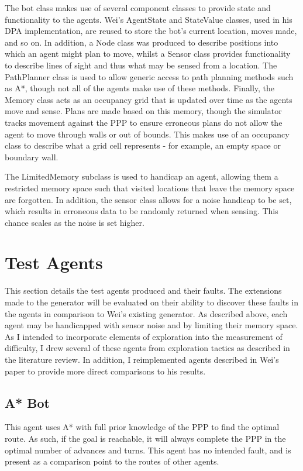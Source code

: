 \documentclass[authoryearcitations]{UoYCSproject}
\begin{document}
The bot class makes use of several component classes to provide state and functionality to the agents. Wei's AgentState and StateValue classes, used in his DPA implementation, are reused to store the bot's current location, moves made, and so on. In addition, a Node class was produced to describe positions into which an agent might plan to move, whilst a Sensor class provides functionality to describe lines of sight and thus what may be sensed from a location. The PathPlanner class is used to allow generic access to path planning methods such as A*, though not all of the agents make use of these methods. Finally, the Memory class acts as an occupancy grid that is updated over time as the agents move and sense. Plans are made based on this memory, though the simulator tracks movement against the PPP to ensure erroneous plans do not allow the agent to move through walls or out of bounds. This makes use of an occupancy class to describe what a grid cell represents - for example, an empty space or boundary wall.

The LimitedMemory subclass is used to handicap an agent, allowing them a restricted memory space such that visited locations that leave the memory space are forgotten. In addition, the sensor class allows for a noise handicap to be set, which results in erroneous data to be randomly returned when sensing. This chance scales as the noise is set higher.

\section{Test Agents}
\label{sec:da_5}
This section details the test agents produced and their faults. The extensions made to the generator will be evaluated on their ability to discover these faults in the agents in comparison to Wei's existing generator. As described above, each agent may be handicapped with sensor noise and by limiting their memory space. As I intended to incorporate elements of exploration into the measurement of difficulty, I drew several of these agents from exploration tactics as described in the literature review. In addition, I reimplemented agents described in Wei's paper to provide more direct comparisons to his results.

\subsection{A* Bot}
\label{sec:da_5_1}
This agent uses A* with full prior knowledge of the PPP to find the optimal route. As such, if the goal is reachable, it will always complete the PPP in the optimal number of advances and turns. This agent has no intended fault, and is present as a comparison point to the routes of other agents.
\end{document}

